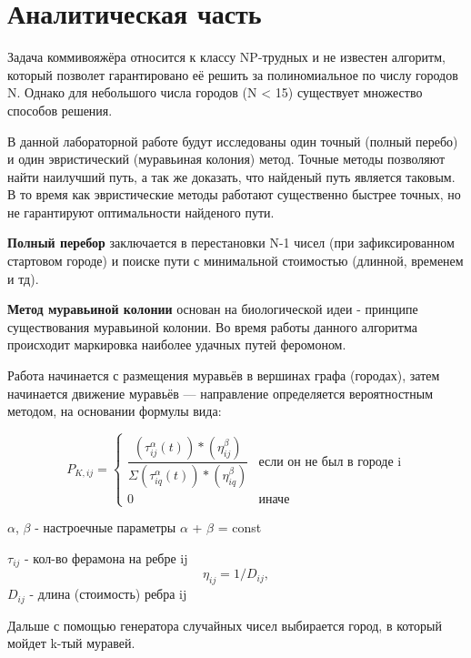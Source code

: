 \documentclass[12pt]{report}
\begin{document}
	\chapter{Аналитическая часть}
	Задача коммивояжёра относится к классу NP-трудных и не известен алгоритм, который позволет гарантировано её решить за полиномиальное по числу городов N. Однако для небольшого числа городов (N < 15) существует множество способов решения.
	
	В данной лабораторной работе будут исследованы один точный (полный перебо) и один эвристический (муравьиная колония) метод.
	Точные методы позволяют найти наилучший путь, а так же доказать, что найденый путь является таковым.
	В то время как эвристические методы работают существенно быстрее точных, но не гарантируют оптимальности найденого пути.
	
	\textbf{Полный перебор} заключается в перестановки N-1 чисел (при зафиксированном стартовом городе) и поиске пути с минимальной стоимостью (длинной, временем и тд).
	
	\textbf{Метод муравьиной колонии} основан на биологической идеи - принципе существования муравьиной колонии.
	Во время работы данного алгоритма происходит маркировка наиболее удачных путей феромоном.
	
	Работа начинается с размещения муравьёв в вершинах графа (городах), затем начинается движение муравьёв — направление определяется вероятностным методом, на основании формулы вида:

	\begin{equation}
		P_{K, ij} = \begin{cases}
		\dfrac{(\tau_{ij}^\alpha(t))*(\eta_{ij}^\beta)}{\Sigma(\tau_{iq}^\alpha(t))*(\eta_{iq}^\beta)}
		& \textrm{если он не был в городе i}\\ 
		0 & \textrm{иначе}
		\end{cases}
	\end{equation}
	\begin{flushleft}
		$\alpha$, $\beta$ - настроечные параметры
		$\alpha$ + $\beta$  = const
		
		$\tau_{ij}$ - кол-во ферамона на ребре ij
		\begin{equation}
		\eta_{ij} = 1/D_{ij},
		\end{equation}
		{$D_{ij}$} - длина (стоимость) ребра ij
	\end{flushleft}
	
	Дальше с помощью генератора случайных чисел выбирается город, в который мойдет k-тый муравей.
	
\end{document}
